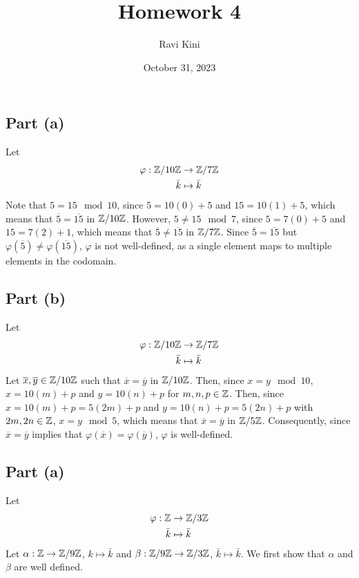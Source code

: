 \documentclass{article}
\title{Homework 4}
\author{Ravi Kini}
\date{October 31, 2023}
\begin{document}
\maketitle

\problem
\subsection*{Part (a)}
Let
\begin{equation}
    \begin{split}
        \varphi: \mathbb{Z}/10\mathbb{Z} & \to \mathbb{Z}/7\mathbb{Z} \\
            \bar k &  \mapsto \bar k
    \end{split}
\end{equation}
Note that $5 = 15 \mod 10$, since $5 = 10\left(0\right) + 5$ and $15 = 10\left(1\right) + 5$, which means that $\overline{5} = \overline{15}$ in $\mathbb{Z}/10\mathbb{Z}$. However, $5 \neq 15 \mod 7$, since $5 = 7\left(0\right) + 5$ and $15 = 7\left(2\right) + 1$, which means that $\overline{5} \neq \overline{15}$ in $\mathbb{Z}/7\mathbb{Z}$. Since $\overline{5} = \overline{15}$ but $\varphi\left(\overline{5}\right) \neq \varphi\left(\overline{15}\right)$, $\varphi$ is not well-defined, as a single element maps to multiple elements in the codomain. 
\subsection*{Part (b)}
Let
\begin{equation}
    \begin{split}
        \varphi: \mathbb{Z}/10\mathbb{Z} & \to \mathbb{Z}/7\mathbb{Z} \\
            \bar k &  \mapsto \bar k
    \end{split}
\end{equation}
Let $\overline{x}, \overline{y} \in \mathbb{Z}/10\mathbb{Z}$ such that $\overline{x} = \overline{y}$ in $\mathbb{Z}/10\mathbb{Z}$. Then, since $x = y \mod 10$, $x = 10\left(m\right) + p$ and $y = 10\left(n\right) + p$ for $m, n, p \in \mathbb{Z}$. Then, since $x = 10\left(m\right) + p = 5\left(2m\right) + p$ and $y = 10\left(n\right) + p = 5\left(2n\right) + p$ with $2m, 2n \in \mathbb{Z}$, $x = y \mod 5$, which means that $\overline{x} = \overline{y}$ in $\mathbb{Z}/5\mathbb{Z}$. Consequently, since $\overline{x} = \overline{y}$ implies that $\varphi\left(\overline{x}\right) = \varphi\left(\overline{y}\right)$, $\varphi$ is well-defined.

\clearpage

\problem
\subsection*{Part (a)}
Let
\begin{equation}
    \begin{split}
        \varphi: \mathbb{Z} & \to \mathbb{Z}/3\mathbb{Z} \\
            \bar k &  \mapsto \bar k
    \end{split}
\end{equation}
Let $\alpha: \mathbb{Z} \to \mathbb{Z}/9\mathbb{Z}$, $k \mapsto \bar k$ and $\beta: \mathbb{Z}/9\mathbb{Z} \to \mathbb{Z}/3\mathbb{Z}$, $\bar k \mapsto \bar k$. We first show that $\alpha$ and $\beta$ are well defined.
\end{document}
